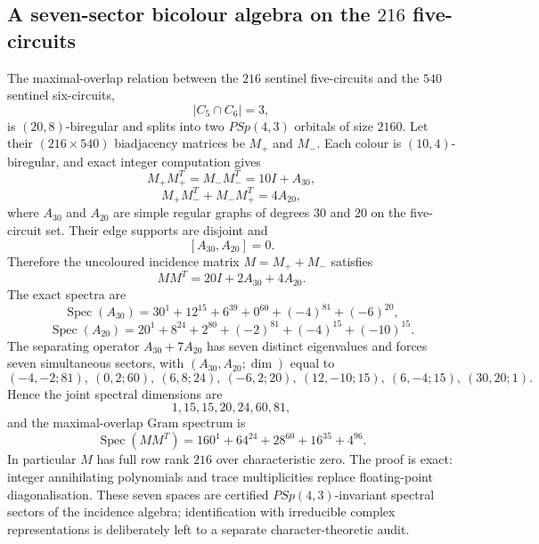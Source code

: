 \subsection{A seven-sector bicolour algebra on the $216$ five-circuits}
The maximal-overlap relation between the $216$ sentinel five-circuits and the $540$ sentinel six-circuits,
\[
|C_5\cap C_6|=3,
\]
is $(20,8)$-biregular and splits into two $PSp(4,3)$ orbitals of size $2160$.  Let their $(216\times540)$ biadjacency matrices be $M_+$ and $M_-$.  Each colour is $(10,4)$-biregular, and exact integer computation gives
\[
M_+M_+^T=M_-M_-^T=10I+A_{30},
\]
\[
M_+M_-^T+M_-M_+^T=4A_{20},
\]
where $A_{30}$ and $A_{20}$ are simple regular graphs of degrees $30$ and $20$ on the five-circuit set.  Their edge supports are disjoint and
\[
[A_{30},A_{20}]=0.
\]
Therefore the uncoloured incidence matrix $M=M_++M_-$ satisfies
\[
MM^T=20I+2A_{30}+4A_{20}.
\]
The exact spectra are
\[
\operatorname{Spec}(A_{30})=30^1+12^{15}+6^{39}+0^{60}+(-4)^{81}+(-6)^{20},
\]
\[
\operatorname{Spec}(A_{20})=20^1+8^{24}+2^{80}+(-2)^{81}+(-4)^{15}+(-10)^{15}.
\]
The separating operator $A_{30}+7A_{20}$ has seven distinct eigenvalues and forces seven simultaneous sectors, with $(A_{30},A_{20};\dim)$ equal to
\[
(-4,-2;81),\ (0,2;60),\ (6,8;24),\ (-6,2;20),\ (12,-10;15),\ (6,-4;15),\ (30,20;1).
\]
Hence the joint spectral dimensions are
\[
\boxed{1,15,15,20,24,60,81},
\]
and the maximal-overlap Gram spectrum is
\[
\boxed{\operatorname{Spec}(MM^T)=160^1+64^{24}+28^{60}+16^{35}+4^{96}}.
\]
In particular $M$ has full row rank $216$ over characteristic zero.  The proof is exact: integer annihilating polynomials and trace multiplicities replace floating-point diagonalisation.  These seven spaces are certified $PSp(4,3)$-invariant spectral sectors of the incidence algebra; identification with irreducible complex representations is deliberately left to a separate character-theoretic audit.
